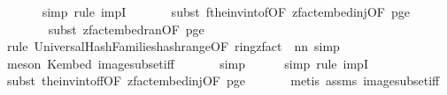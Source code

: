 \begin{isabellebody}
\ \ \ \ \ \isamarkupfalse%
\ {\isacharparenleft}{\kern0pt}simp{\isacharcomma}{\kern0pt}\ rule\ impI{\isacharparenright}{\kern0pt}\isanewline
\ \ \ \ \ \isamarkupfalse%
\ {\isacharparenleft}{\kern0pt}subst\ f{\isacharunderscore}{\kern0pt}the{\isacharunderscore}{\kern0pt}inv{\isacharunderscore}{\kern0pt}into{\isacharunderscore}{\kern0pt}f{\isacharbrackleft}{\kern0pt}OF\ zfact{\isacharunderscore}{\kern0pt}embed{\isacharunderscore}{\kern0pt}inj{\isacharbrackleft}{\kern0pt}OF\ p{\isacharunderscore}{\kern0pt}ge{\isacharunderscore}{\kern0pt}{}{\isacharbrackright}{\kern0pt}{\isacharbrackright}{\kern0pt}{\isacharparenright}{\kern0pt}\isanewline
\ \ \ \ \ \ \isamarkupfalse%
\ {\isacharparenleft}{\kern0pt}subst\ zfact{\isacharunderscore}{\kern0pt}embed{\isacharunderscore}{\kern0pt}ran{\isacharbrackleft}{\kern0pt}OF\ p{\isacharunderscore}{\kern0pt}ge{\isacharunderscore}{\kern0pt}{}{\isacharbrackright}{\kern0pt}{\isacharparenright}{\kern0pt}\isanewline
\ \ \ \ \ \ \isamarkupfalse%
\ {\isacharparenleft}{\kern0pt}rule\ Universal{\isacharunderscore}{\kern0pt}Hash{\isacharunderscore}{\kern0pt}Families{\isachardot}{\kern0pt}hash{\isacharunderscore}{\kern0pt}range{\isacharbrackleft}{\kern0pt}OF\ ring{\isacharunderscore}{\kern0pt}zfact{\isacharcomma}{\kern0pt}\ \ n{\isacharequal}{\kern0pt}{\isachardoublequoteopen}n{\isachardoublequoteclose}{\isacharbrackright}{\kern0pt}{\isacharcomma}{\kern0pt}\ simp{\isacharparenright}{\kern0pt}\isanewline
\ \ \ \ \ \ \isamarkupfalse%
\ {\isacharparenleft}{\kern0pt}meson\ K{\isacharunderscore}{\kern0pt}embed\ image{\isacharunderscore}{\kern0pt}subset{\isacharunderscore}{\kern0pt}iff{\isacharparenright}{\kern0pt}\isanewline
\ \ \ \ \ \isamarkupfalse%
\ simp\isanewline
\ \ \ \ \isamarkupfalse%
\ {\isacharparenleft}{\kern0pt}simp{\isacharcomma}{\kern0pt}\ rule\ impI{\isacharparenright}{\kern0pt}\isanewline
\ \ \ \ \isamarkupfalse%
\ {\isacharparenleft}{\kern0pt}subst\ the{\isacharunderscore}{\kern0pt}inv{\isacharunderscore}{\kern0pt}into{\isacharunderscore}{\kern0pt}f{\isacharunderscore}{\kern0pt}f{\isacharbrackleft}{\kern0pt}OF\ zfact{\isacharunderscore}{\kern0pt}embed{\isacharunderscore}{\kern0pt}inj{\isacharbrackleft}{\kern0pt}OF\ p{\isacharunderscore}{\kern0pt}ge{\isacharunderscore}{\kern0pt}{}{\isacharbrackright}{\kern0pt}{\isacharbrackright}{\kern0pt}{\isacharparenright}{\kern0pt}\isanewline
\ \ \ \ \ \isamarkupfalse%
\ {\isacharparenleft}{\kern0pt}metis\ assms{\isacharparenleft}{\kern0pt}{}{\isacharparenright}{\kern0pt}\ image{\isacharunderscore}{\kern0pt}subset{\isacharunderscore}{\kern0pt}iff{\isacharparenright}{\kern0pt}\ \isanewline

\end{isabellebody}
